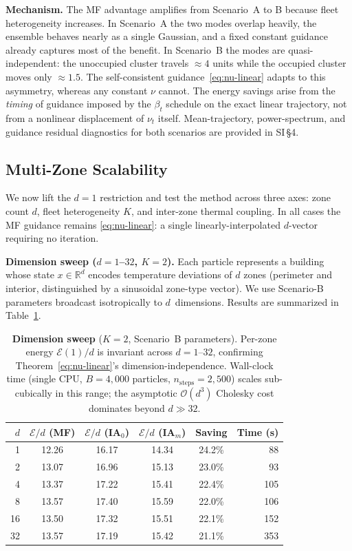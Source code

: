 \documentclass[11pt,onecolumn]{article}
\newcommand{\calE}{\mathcal{E}}
\begin{document}
\textbf{Mechanism.} The MF advantage amplifies from Scenario~A to B because fleet heterogeneity increases. In Scenario~A the two modes overlap heavily, the ensemble behaves nearly as a single Gaussian, and a fixed constant guidance already captures most of the benefit. In Scenario~B the modes are quasi-independent: the unoccupied cluster travels ${\approx}4$ units while the occupied cluster moves only ${\approx}1.5$. The self-consistent guidance~\eqref{eq:nu-linear} adapts to this asymmetry, whereas any constant $\nu$ cannot. The energy savings arise from the \emph{timing} of guidance imposed by the $\beta_t$ schedule on the exact linear trajectory, not from a nonlinear displacement of $\nu_t$ itself. Mean-trajectory, power-spectrum, and guidance residual diagnostics for both scenarios are provided in SI\,\S4.

\subsection*{Multi-Zone Scalability}

We now lift the $d=1$ restriction and test the method across three axes: zone count $d$, fleet heterogeneity $K$, and inter-zone thermal coupling. In all cases the MF guidance remains \eqref{eq:nu-linear}: a single linearly-interpolated $d$-vector requiring no iteration.

\textbf{Dimension sweep ($d=1$--$32$, $K=2$).} Each particle represents a building whose state $x\in\mathbb{R}^d$ encodes temperature deviations of $d$ zones (perimeter and interior, distinguished by a sinusoidal zone-type vector). We use Scenario-B parameters broadcast isotropically to $d$~dimensions. Results are summarized in Table~\ref{tab:d_sweep}.

\begin{table}[h!]
\centering
\caption{\textbf{Dimension sweep} ($K=2$, Scenario~B parameters). Per-zone energy $\calE(1)/d$ is invariant across $d=1$--$32$, confirming Theorem~\eqref{eq:nu-linear}'s dimension-independence. Wall-clock time (single CPU, $B=4{,}000$ particles, $n_\mathrm{steps}=2{,}500$) scales sub-cubically in this range; the asymptotic $\mathcal{O}(d^3)$ Cholesky cost dominates beyond $d\gg 32$.}
\label{tab:d_sweep}
\small
\setlength{\tabcolsep}{5pt}
\begin{tabular}{r ccc c r}
\toprule
$d$ & $\calE/d$ (MF) & $\calE/d$ (IA$_0$) & $\calE/d$ (IA$_m$) & Saving & Time (s) \\
\midrule
 1 & 12.26 & 16.17 & 14.34 & 24.2\% &  88 \\
 2 & 13.07 & 16.96 & 15.13 & 23.0\% &  93 \\
 4 & 13.37 & 17.22 & 15.41 & 22.4\% & 105 \\
 8 & 13.57 & 17.40 & 15.59 & 22.0\% & 106 \\
16 & 13.50 & 17.32 & 15.51 & 22.1\% & 152 \\
32 & 13.57 & 17.19 & 15.42 & 21.1\% & 353 \\
\bottomrule
\end{tabular}
\end{table}
\end{document}
